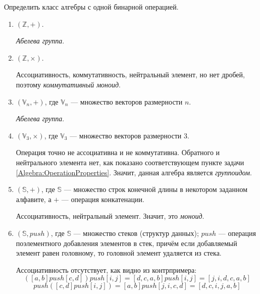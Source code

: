 \begin{task}\label{Algebra:GrouppoidType}
    Определить класс алгебры с одной бинарной операцией.
    \begin{enumerate}
        \item $(\mathbb{Z},+)$.\\
        \begin{solution}
            \textit{Абелева группа}.
        \end{solution}

        \item $(\mathbb{Z},\times)$.\\
        \begin{solution}
            Ассоциативность, коммутативность, нейтральный элемент, но нет дробей, поэтому \textit{коммутативный моноид}.
        \end{solution}

        \item $(\mathbb{V}_n, +)$, где $\mathbb{V}_n$ --- множество векторов размерности $n$.\\
        \begin{solution}
            \textit{Абелева группа}.
        \end{solution}

        \item $(\mathbb{V}_3, \times)$, где $\mathbb{V}_3$ --- множество векторов размерности $3$.\\
        \begin{solution}
            Операция точно не ассоциативна и не коммутативна. Обратного и нейтрального элемента нет, как показано соответствующем пункте задачи \ref{Algebra:OperationProperties}. Значит, данная алгебра является \textit{группоидом}.
        \end{solution}

        \item $(\mathbb{S}, +)$, где $\mathbb{S}$ --- множество строк конечной длины в некотором заданном алфавите, а $+$ --- операция конкатенации.\\
        \begin{solution}
            Ассоциативность, нейтральный элемент. Значит, это \textit{моноид}.
        \end{solution}

        \item $(\mathbb{S}, push)$, где $\mathbb{S}$ --- множество стеков (структур данных); $push$ --- операция поэлементного добавления элементов в стек, причём если добавляемый элемент равен головному, то головной элемент удаляется из стека.\\
        \begin{solution}
            Ассоциативность отсутствует, как видно из контрпримера:
            \begin{equation*}
                ([a,b]push[c,d])push[i,j] = [d,c,a,b]push[i,j] = [j,i,d,c,a,b]
            \end{equation*}
            \begin{equation*}
                [a,b]push([c,d]push[i,j]) = [a,b]push[j,i,c,d] = [d,c,i,j,a,b]
            \end{equation*}


\end{solution}
\end{enumerate}
\end{task}
